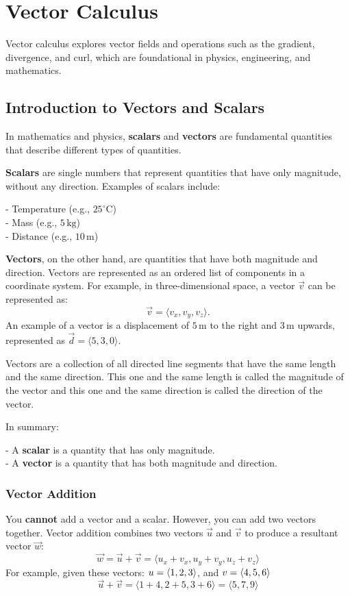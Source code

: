 \chapter{Vector Calculus}
Vector calculus explores vector fields and operations such as the gradient, divergence, and curl, which are foundational in physics, engineering, and mathematics.

\section{Introduction to Vectors and Scalars}
In mathematics and physics, \textbf{scalars} and \textbf{vectors} are fundamental quantities that describe different types of quantities.

\textbf{Scalars} are single numbers that represent quantities that have only magnitude, without any direction. Examples of scalars include:

- Temperature (e.g., \(25^\circ \text{C}\))\\
- Mass (e.g., \(5 \, \text{kg}\))\\
- Distance (e.g., \(10 \, \text{m}\))

\textbf{Vectors}, on the other hand, are quantities that have both magnitude and direction. Vectors are represented as an ordered list of components in a coordinate system. For example, in three-dimensional space, a vector \(\vec{v}\) can be represented as:
\[
\vec{v} = \langle v_x, v_y, v_z \rangle.
\]
An example of a vector is a displacement of \(5 \, \text{m}\) to the right and \(3 \, \text{m}\) upwards, represented as \(\vec{d} = \langle 5, 3, 0 \rangle\).


Vectors are a collection of all directed line segments that have the same length and the same direction. This one and the same length is called the magnitude of the vector and this one and the same direction is called the direction of the vector.

In summary:

- A \textbf{scalar} is a quantity that has only magnitude.\\
- A \textbf{vector} is a quantity that has both magnitude and direction.

\subsection{Vector Addition}
You \textbf{cannot} add a vector and a scalar. However, you can add two vectors together. Vector addition combines two vectors \(\vec{u}\) and \(\vec{v}\) to produce a resultant vector \(\vec{w}\):
\begin{equation}\label{Vector Addition}
    \vec{w} = \vec{u} + \vec{v} = \langle u_x + v_x, u_y + v_y, u_z + v_z \rangle
\end{equation}
For example, given these vectors: $u = \left\langle 1, 2, 3 \right\rangle$, and $v = \left\langle 4, 5, 6 \right\rangle$
\[
\vec{u} + \vec{v} = \langle 1 + 4, 2 + 5, 3 + 6 \rangle = \langle 5, 7, 9 \rangle
\]

